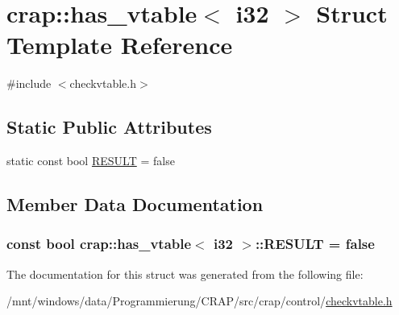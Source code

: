 \hypertarget{structcrap_1_1has__vtable_3_01i32_01_4}{\section{crap\-:\-:has\-\_\-vtable$<$ i32 $>$ Struct Template Reference}
\label{structcrap_1_1has__vtable_3_01i32_01_4}
}


{\ttfamily \#include $<$checkvtable.\-h$>$}

\subsection*{Static Public Attributes}
\begin{DoxyCompactItemize}
\item 
static const bool \hyperlink{structcrap_1_1has__vtable_3_01i32_01_4_a200a3f8dcd48d76ca33f889d57a06931}{R\-E\-S\-U\-L\-T} = false
\end{DoxyCompactItemize}


\subsection{Member Data Documentation}
\hypertarget{structcrap_1_1has__vtable_3_01i32_01_4_a200a3f8dcd48d76ca33f889d57a06931}{
\subsubsection[{R\-E\-S\-U\-L\-T}]{\setlength{\rightskip}{0pt plus 5cm}const bool {\bf crap\-::has\-\_\-vtable}$<$ {\bf i32} $>$\-::R\-E\-S\-U\-L\-T = false\hspace{0.3cm}{\ttfamily [static]}}}\label{structcrap_1_1has__vtable_3_01i32_01_4_a200a3f8dcd48d76ca33f889d57a06931}


The documentation for this struct was generated from the following file\-:\begin{DoxyCompactItemize}
\item 
/mnt/windows/data/\-Programmierung/\-C\-R\-A\-P/src/crap/control/\hyperlink{checkvtable_8h}{checkvtable.\-h}\end{DoxyCompactItemize}
